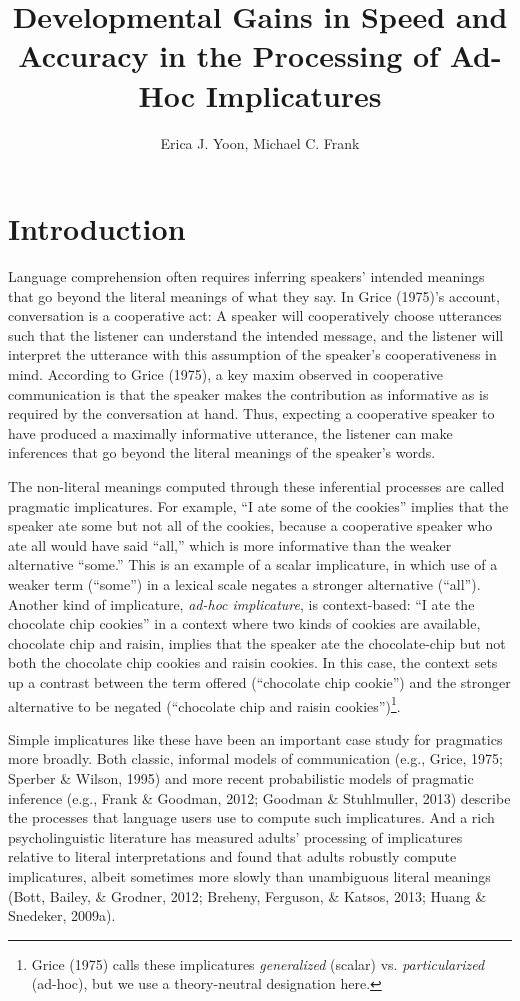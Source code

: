 \documentclass[a4paper,man,apacite,floatsintext]{apa6}
\date{}
\title{\textbf{Developmental Gains in Speed and Accuracy in the Processing of Ad-Hoc
Implicatures}}
\author{Erica J. Yoon, Michael C. Frank}
\affiliation{Department of Psychology, Stanford University}
\begin{document}
\maketitle

\section{Introduction}\label{introduction}

Language comprehension often requires inferring speakers' intended
meanings that go beyond the literal meanings of what they say. In Grice
(1975)'s account, conversation is a cooperative act: A speaker will
cooperatively choose utterances such that the listener can understand
the intended message, and the listener will interpret the utterance with
this assumption of the speaker's cooperativeness in mind. According to
Grice (1975), a key maxim observed in cooperative communication is that
the speaker makes the contribution as informative as is required by the
conversation at hand. Thus, expecting a cooperative speaker to have
produced a maximally informative utterance, the listener can make
inferences that go beyond the literal meanings of the speaker's words.

The non-literal meanings computed through these inferential processes
are called pragmatic implicatures. For example, ``I ate some of the
cookies'' implies that the speaker ate some but not all of the cookies,
because a cooperative speaker who ate all would have said ``all,'' which
is more informative than the weaker alternative ``some.'' This is an
example of a scalar implicature, in which use of a weaker term
(``some'') in a lexical scale negates a stronger alternative (``all'').
Another kind of implicature, \emph{ad-hoc implicature}, is
context-based: ``I ate the chocolate chip cookies'' in a context where
two kinds of cookies are available, chocolate chip and raisin, implies
that the speaker ate the chocolate-chip but not both the chocolate chip
cookies and raisin cookies. In this case, the context sets up a contrast
between the term offered (``chocolate chip cookie'') and the stronger
alternative to be negated (``chocolate chip and raisin
cookies'')\footnote{Grice (1975) calls these implicatures
  \emph{generalized} (scalar) vs. \emph{particularized} (ad-hoc), but we
  use a theory-neutral designation here.}.

Simple implicatures like these have been an important case study for
pragmatics more broadly. Both classic, informal models of communication
(e.g., Grice, 1975; Sperber \& Wilson, 1995) and more recent
probabilistic models of pragmatic inference (e.g., Frank \& Goodman,
2012; Goodman \& Stuhlmuller, 2013) describe the processes that language
users use to compute such implicatures. And a rich psycholinguistic
literature has measured adults' processing of implicatures relative to
literal interpretations and found that adults robustly compute
implicatures, albeit sometimes more slowly than unambiguous literal
meanings (Bott, Bailey, \& Grodner, 2012; Breheny, Ferguson, \& Katsos,
2013; Huang \& Snedeker, 2009a).
\end{document}
